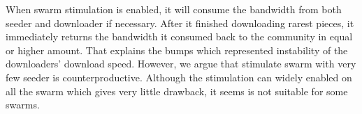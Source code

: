 When swarm stimulation is enabled, it will consume the bandwidth from both seeder and downloader if necessary. After it finished downloading rarest pieces, it immediately returns the bandwidth it consumed back to the community in equal or higher amount. That explains the bumps which represented instability of the downloaders' download speed. However, we argue that stimulate swarm with very few seeder is counterproductive. Although the stimulation can widely enabled on all the swarm which gives very little drawback, it seems is not suitable for some swarms. 

